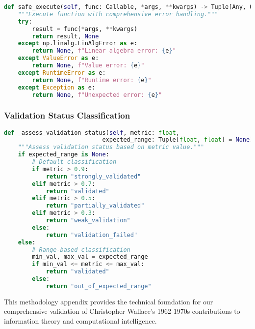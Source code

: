 \begin{lstlisting}[language=Python, caption=Error handling]
def safe_execute(self, func: Callable, *args, **kwargs) -> Tuple[Any, Optional[str]]:
    """Execute function with comprehensive error handling."""
    try:
        result = func(*args, **kwargs)
        return result, None
    except np.linalg.LinAlgError as e:
        return None, f"Linear algebra error: {e}"
    except ValueError as e:
        return None, f"Value error: {e}"
    except RuntimeError as e:
        return None, f"Runtime error: {e}"
    except Exception as e:
        return None, f"Unexpected error: {e}"
\end{lstlisting}

\subsubsection{Validation Status Classification}

\begin{lstlisting}[language=Python, caption=Validation status assessment]
def _assess_validation_status(self, metric: float,
                            expected_range: Tuple[float, float] = None) -> str:
    """Assess validation status based on metric value."""
    if expected_range is None:
        # Default classification
        if metric > 0.9:
            return "strongly_validated"
        elif metric > 0.7:
            return "validated"
        elif metric > 0.5:
            return "partially_validated"
        elif metric > 0.3:
            return "weak_validation"
        else:
            return "validation_failed"
    else:
        # Range-based classification
        min_val, max_val = expected_range
        if min_val <= metric <= max_val:
            return "validated"
        else:
            return "out_of_expected_range"
\end{lstlisting}

This methodology appendix provides the technical foundation for our comprehensive validation of Christopher Wallace's 1962-1970s contributions to information theory and computational intelligence.
